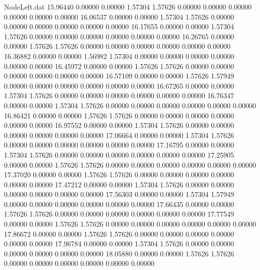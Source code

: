 \begin{filecontents}{NodeLeft.dat}
  15.96440    0.00000    0.00000     1.57304    1.57626    0.00000    0.00000    0.00000    0.00000    0.00000    0.00000
  16.06537    0.00000    0.00000     1.57304    1.57626    0.00000    0.00000    0.00000    0.00000    0.00000    0.00000
  16.17655    0.00000    0.00000     1.57304    1.57626    0.00000    0.00000    0.00000    0.00000    0.00000    0.00000
  16.26765    0.00000    0.00000     1.57626    1.57626    0.00000    0.00000    0.00000    0.00000    0.00000    0.00000
  16.36882    0.00000    0.00000     1.56982    1.57304    0.00000    0.00000    0.00000    0.00000    0.00000    0.00000
  16.45972    0.00000    0.00000     1.57626    1.57626    0.00000    0.00000    0.00000    0.00000    0.00000    0.00000
  16.57109    0.00000    0.00000     1.57626    1.57949    0.00000    0.00000    0.00000    0.00000    0.00000    0.00000
  16.67265    0.00000    0.00000     1.57304    1.57626    0.00000    0.00000    0.00000    0.00000    0.00000    0.00000
  16.76347    0.00000    0.00000     1.57304    1.57626    0.00000    0.00000    0.00000    0.00000    0.00000    0.00000
  16.86421    0.00000    0.00000     1.57626    1.57626    0.00000    0.00000    0.00000    0.00000    0.00000    0.00000
  16.97552    0.00000    0.00000     1.57304    1.57626    0.00000    0.00000    0.00000    0.00000    0.00000    0.00000
  17.06664    0.00000    0.00000     1.57304    1.57626    0.00000    0.00000    0.00000    0.00000    0.00000    0.00000
  17.16795    0.00000    0.00000     1.57304    1.57626    0.00000    0.00000    0.00000    0.00000    0.00000    0.00000
  17.25905    0.00000    0.00000     1.57626    1.57626    0.00000    0.00000    0.00000    0.00000    0.00000    0.00000
  17.37020    0.00000    0.00000     1.57626    1.57626    0.00000    0.00000    0.00000    0.00000    0.00000    0.00000
  17.47212    0.00000    0.00000     1.57304    1.57626    0.00000    0.00000    0.00000    0.00000    0.00000    0.00000
  17.56303    0.00000    0.00000     1.57304    1.57949    0.00000    0.00000    0.00000    0.00000    0.00000    0.00000
  17.66435    0.00000    0.00000     1.57626    1.57626    0.00000    0.00000    0.00000    0.00000    0.00000    0.00000
  17.77549    0.00000    0.00000     1.57626    1.57626    0.00000    0.00000    0.00000    0.00000    0.00000    0.00000
  17.86672    0.00000    0.00000     1.57626    1.57626    0.00000    0.00000    0.00000    0.00000    0.00000    0.00000
  17.96784    0.00000    0.00000     1.57304    1.57626    0.00000    0.00000    0.00000    0.00000    0.00000    0.00000
  18.05880    0.00000    0.00000     1.57626    1.57626    0.00000    0.00000    0.00000    0.00000    0.00000    0.00000

\end{filecontents}
